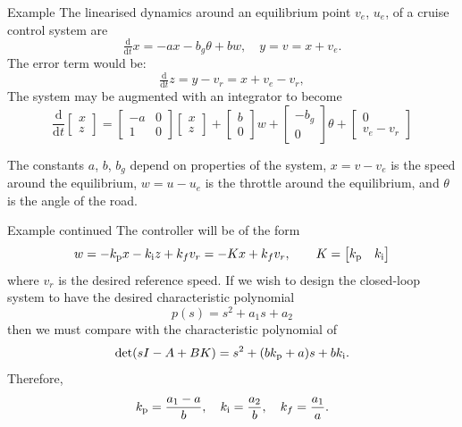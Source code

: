 \documentclass[10pt]{beamer-control}
\begin{document}
\begin{frame}{Example}
The linearised dynamics around an equilibrium point $v_e$, $u_e$, of a cruise control system are 
\begin{equation}
  \tfrac{\mathrm{d}}{\mathrm{d}t} x = -ax-b_g\theta +bw, 
  \quad y=v=x+v_e.
\end{equation}
The error term would be:
\begin{equation}
   \tfrac{\mathrm{d}}{\mathrm{d}t} z = y-v_r = x+v_e-v_r, 
\end{equation}
The system may be augmented with an integrator to become
\begin{equation}\frac{\mathrm{d}}{\mathrm{d}t} \begin{bmatrix}
	x \\ z
\end{bmatrix} = \begin{bmatrix}
-a & 0 \\ 1 & 0
\end{bmatrix}  \begin{bmatrix}
x \\ z
\end{bmatrix} +  \begin{bmatrix}
b \\ 0
\end{bmatrix} w +  \begin{bmatrix}
-b_g\\ 0
\end{bmatrix} \theta +  \begin{bmatrix}
0 \\ v_e-v_r
\end{bmatrix}\end{equation}

The constants $a$, $b$, $b_g$ depend on properties of the system, 
$x=v-v_e$ is the speed around the equilibrium, 
$w=u-u_e$ is the throttle around the equilibrium, and 
$\theta$ is the angle of the road.
\end{frame}

\begin{frame}{Example continued}
The controller will be of the form 
\begin{equation}
w=-k_{\mathrm{p}} x-k_{\mathrm{i}} z+k_fv_r=-Kx+k_fv_r,  \qquad K = \begin{bmatrix}k_{\mathrm{p}} & k_{\mathrm{i}}\end{bmatrix}
\end{equation}
where $v_r$ is the desired reference speed.
If we wish to design the closed-loop system to have the desired characteristic polynomial
\begin{equation}p(s)=s^2+a_1s+a_2\end{equation}
then we must compare with the characteristic polynomial of 
\begin{equation}\operatorname{det}(sI-A+BK) = s^2+(bk_{\mathrm{p}}+a)s+bk_{\mathrm{i}}.\end{equation}
Therefore, 
\begin{equation}k_{\mathrm{p}}=\frac{a_1-a}{b}, \quad k_{\mathrm{i}}=\frac{a_2}{b}, \quad k_f=\frac{a_1}{a}.\end{equation}
\end{frame}
\end{document}
